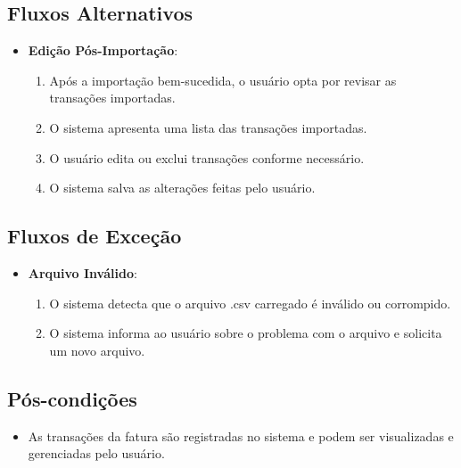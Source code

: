 \subsection*{Fluxos Alternativos}
\begin{addmargin}[1.5cm]{0cm}
    \begin{itemize}
        \item \textbf{Edição Pós-Importação}:
        \begin{enumerate}
            \item Após a importação bem-sucedida, o usuário opta por revisar as transações importadas.
            \item O sistema apresenta uma lista das transações importadas.
            \item O usuário edita ou exclui transações conforme necessário.
            \item O sistema salva as alterações feitas pelo usuário.
        \end{enumerate}
    \end{itemize}
\end{addmargin}

\subsection*{Fluxos de Exceção}
\begin{addmargin}[1.5cm]{0cm}
    \begin{itemize}
        \item \textbf{Arquivo Inválido}:
        \begin{enumerate}
            \item O sistema detecta que o arquivo .csv carregado é inválido ou corrompido.
            \item O sistema informa ao usuário sobre o problema com o arquivo e solicita um novo arquivo.
        \end{enumerate}
    \end{itemize}
\end{addmargin}

\subsection*{Pós-condições}
\begin{addmargin}[1.5cm]{0cm}
    \begin{itemize}
        \item As transações da fatura são registradas no sistema e podem ser visualizadas e gerenciadas pelo usuário.
    \end{itemize}
\end{addmargin}

